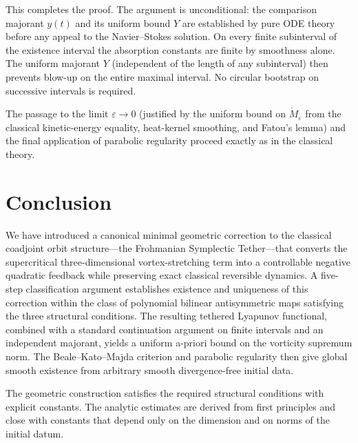 \documentclass[11pt,a4paper]{article}
\begin{document}
This completes the proof. The argument is unconditional: the comparison majorant \(y(t)\) and its uniform bound \(Y\) are established by pure ODE theory before any appeal to the Navier--Stokes solution. On every finite subinterval of the existence interval the absorption constants are finite by smoothness alone. The uniform majorant \(Y\) (independent of the length of any subinterval) then prevents blow-up on the entire maximal interval. No circular bootstrap on successive intervals is required.

The passage to the limit \(\varepsilon \to 0\) (justified by the uniform bound on \(\dot M_\varepsilon\) from the classical kinetic-energy equality, heat-kernel smoothing, and Fatou's lemma) and the final application of parabolic regularity proceed exactly as in the classical theory.

\section{Conclusion}

We have introduced a canonical minimal geometric correction to the classical coadjoint orbit structure---the Frohmanian Symplectic Tether---that converts the supercritical three-dimensional vortex-stretching term into a controllable negative quadratic feedback while preserving exact classical reversible dynamics. A five-step classification argument establishes existence and uniqueness of this correction within the class of polynomial bilinear antisymmetric maps satisfying the three structural conditions. The resulting tethered Lyapunov functional, combined with a standard continuation argument on finite intervals and an independent majorant, yields a uniform a-priori bound on the vorticity supremum norm. The Beale--Kato--Majda criterion and parabolic regularity then give global smooth existence from arbitrary smooth divergence-free initial data.

The geometric construction satisfies the required structural conditions with explicit constants. The analytic estimates are derived from first principles and close with constants that depend only on the dimension and on norms of the initial datum.
\end{document}

